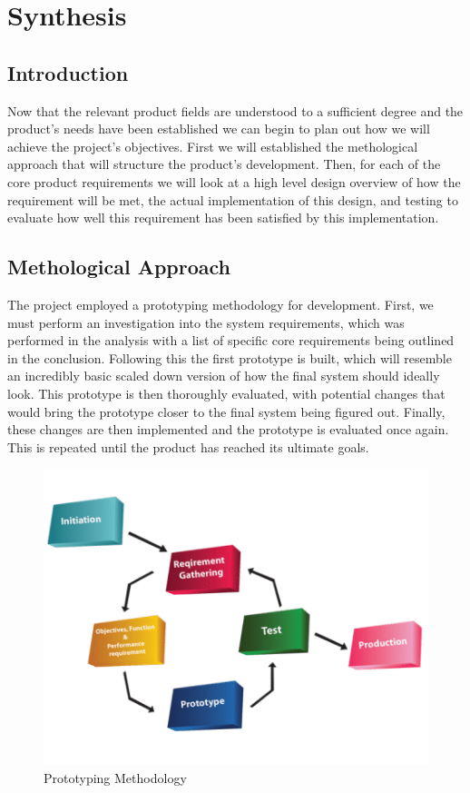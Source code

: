 \part{Synthesis}
	\chapter{Introduction}
	Now that the relevant product fields are understood to a sufficient degree and the product's needs have been established we can begin to plan out how we will achieve the project's objectives. First we will established the methological approach that will structure the product's development. Then, for each of the core product requirements we will look at a high level design overview of how the requirement will be met, the actual implementation of this design, and testing to evaluate how well this requirement has been satisfied by this implementation.
	
	\chapter{Methological Approach}
	The project employed a prototyping methodology for development. First, we must perform an investigation into the system requirements, which was performed in the analysis with a list of specific core requirements being outlined in the conclusion. Following this the first prototype is built, which will resemble an incredibly basic scaled down version of how the final system should ideally look. This prototype is then thoroughly evaluated, with potential changes that would bring the prototype closer to the final system being figured out. Finally, these changes are then implemented and the prototype is evaluated once again. This is repeated until the product has reached its ultimate goals.
	\begin{figure}[h]
		\centering
		\includegraphics[width=.8\linewidth]{SYNTHESIS/prototypingdiagram.png}
		\caption{Prototyping Methodology}
		\label{fig:prototypingdiagram}
	\end{figure}
	
